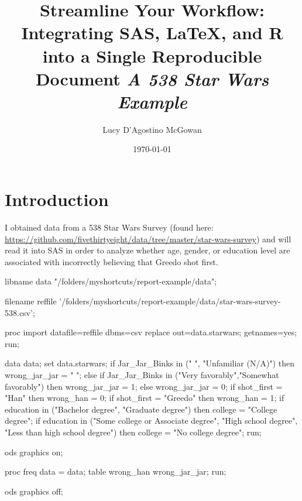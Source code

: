 \documentclass{article}\usepackage[]{graphicx}\usepackage[]{color}
\title{Streamline Your Workflow: Integrating SAS, LaTeX, and R into a Single Reproducible Document \emph{A 538 Star Wars Example}}
\author{Lucy D'Agostino McGowan}
\date{\today}
\begin{document}
\maketitle
\section{Introduction}

I obtained data from a 538 Star Wars Survey (found here: \url{https://github.com/fivethirtyeight/data/tree/master/star-wars-survey}) and will read it into SAS in order to analyze whether age, gender, or education level are associated with incorrectly believing that Greedo shot first.

\begin{Sascode}
libname data "/folders/myshortcuts/report-example/data";

filename reffile 
  '/folders/myshortcuts/report-example/data/star-wars-survey-538.csv';

proc import datafile=reffile
	dbms=csv
	replace
	out=data.starwars;
	getnames=yes;
run;
\end{Sascode}

\begin{Sascode}
data data;
 set data.starwars;
  if Jar_Jar_Binks in (" ", "Unfamiliar (N/A)")
    then wrong_jar_jar = " ";
  else if Jar_Jar_Binks in ("Very favorably","Somewhat favorably") 
    then wrong_jar_jar = 1;
    else wrong_jar_jar = 0;
  if shot_first = "Han" 
    then wrong_han = 0;
  if shot_first = "Greedo" 
    then wrong_han = 1;
  if education in ("Bachelor degree", "Graduate degree") 
    then college = "College degree";
  if education in ("Some college or Associate degree", 
    "High school degree", "Less than high school degree") 
    then college = "No college degree";
run;

\end{Sascode}

\begin{Sascode}[store=freq]
ods graphics on;

proc freq data = data;
table wrong_han wrong_jar_jar;
run;

ods graphics off;
\end{Sascode}


\end{document}
